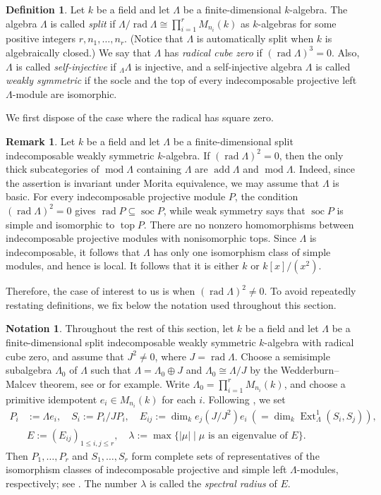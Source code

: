 \documentclass{amsart}
\theoremstyle{definition}
\newtheorem{dfn}[thm]{Definition}
\newtheorem{rem}[thm]{Remark}
\newtheorem{nota}[thm]{Notation}
\theoremstyle{remark}
\numberwithin{equation}{thm}
\def\add{\operatorname{add}}
\def\dim{\operatorname{dim}}
\def\Ext{\operatorname{Ext}}
\def\L{\Lambda}
\def\le{\leqslant}
\def\mod{\operatorname{mod}}
\def\rad{\operatorname{rad}}
\def\soc{\operatorname{soc}}
\begin{document}
\begin{dfn}
Let $k$ be a field and let $\L$ be a finite-dimensional $k$-algebra. 
The algebra $\L$ is called \textit{split} if $\L/\rad\L\cong\prod_{i=1}^r M_{n_i}(k)$ as $k$-algebras for some positive integers $r,n_1,\ldots,n_r$. 
(Notice that $\L$ is automatically split when $k$ is algebraically closed.)
We say that $\L$ has \textit{radical cube zero} if $(\rad\L)^3=0$. 
Also, $\L$ is called \textit{self-injective} if $\!{}_{\L}\L$ is injective, and a self-injective algebra $\L$ is called \textit{weakly symmetric} if the socle and the top of every indecomposable projective left $\L$-module are isomorphic.
\end{dfn}

We first dispose of the case where the radical has square zero.

\begin{rem}\label{square zero}
Let $k$ be a field and let $\L$ be a finite-dimensional split indecomposable weakly symmetric $k$-algebra. 
If $(\rad\L)^2=0$, then the only thick subcategories of $\mod\L$ containing $\L$ are $\add\L$ and $\mod\L$. Indeed, since the assertion is invariant under Morita equivalence, we may assume that $\L$ is basic.
For every indecomposable projective module $P$, the condition $(\rad\L)^2=0$ gives $\rad P\subseteq\soc P$, while weak symmetry says that $\soc P$ is simple and isomorphic to $\operatorname{top} P$. There are no nonzero homomorphisms between indecomposable projective modules with nonisomorphic tops. Since $\L$ is indecomposable, it follows that $\L$ has only one isomorphism class of simple modules, and hence is local. It follows that it is either $k$ or $k[x]/(x^2)$.
\end{rem}

Therefore, the case of interest to us is when $(\rad\L)^2\ne0$.
To avoid repeatedly restating definitions, we fix below the notation used throughout this section.

\begin{nota}\label{notation}
Throughout the rest of this section, let $k$ be a field and let $\L$ be a finite-dimensional split indecomposable weakly symmetric $k$-algebra with radical cube zero, and assume that $J^2\ne0$, where $J=\rad\L$. Choose a semisimple subalgebra $\L_0$ of $\L$ such that $\L=\L_0\oplus J$ and $\L_0\cong\L/J$ by the Wedderburn--Malcev theorem, see \cite[Theorem 72.19]{CR} or \cite[Theorem 11.6]{P} for example.  Write $\L_0=\prod_{i=1}^r M_{n_i}(k)$, and choose a primitive idempotent $e_i\in M_{n_i}(k)$ for each $i$.
Following \cite{Ben}, we set
\begin{align*}
P_i&:=\L e_i, \quad S_i:=P_i/JP_i, \quad E_{ij}:=\dim_k e_j(J/J^2)e_i\ (=\dim_k\Ext_\L^1(S_i,S_j)),
\\
&E:=(E_{ij})_{1\le i,j\le r}, \quad
\lambda:=\max\{|\mu|\mid \text{$\mu$ is an eigenvalue of $E$}\}.
\end{align*}
Then $P_1,\ldots,P_r$ and $S_1,\ldots,S_r$ form complete sets of representatives of the isomorphism classes of indecomposable projective and simple left $\L$-modules, respectively; see \cite[Theorem 25.3]{Lam}.
The number $\lambda$ is called the \textit{spectral radius} of $E$.
\end{nota}
\end{document}
